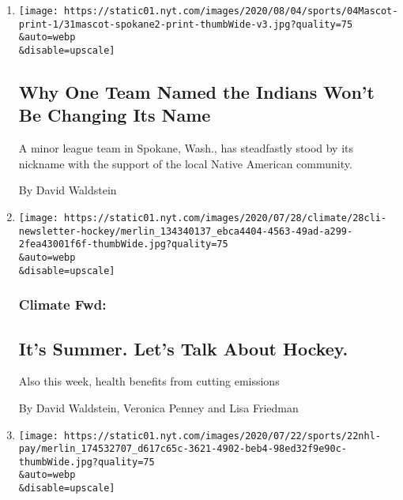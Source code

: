 \begin{enumerate}
\def\labelenumi{\arabic{enumi}.}
\item
  \href{/2020/08/03/sports/baseball/indians-team-names-mascots.html}{}

  \texttt{[image: https://static01.nyt.com/images/2020/08/04/sports/04Mascot-print-1/31mascot-spokane2-print-thumbWide-v3.jpg?quality=75\\\&auto=webp\\\&disable=upscale]}

  \hypertarget{why-one-team-named-the-indians-wont-be-changing-its-name}{%
  \subsection{Why One Team Named the Indians Won't Be Changing Its
  Name}\label{why-one-team-named-the-indians-wont-be-changing-its-name}}

  A minor league team in Spokane, Wash., has steadfastly stood by its
  nickname with the support of the local Native American community.

  By David Waldstein
\item
  \href{/2020/07/29/climate/skating-hockey-climate-change.html}{}

  \texttt{[image: https://static01.nyt.com/images/2020/07/28/climate/28cli-newsletter-hockey/merlin\_134340137\_ebca4404-4563-49ad-a299-2fea43001f6f-thumbWide.jpg?quality=75\\\&auto=webp\\\&disable=upscale]}

  \hypertarget{climate-fwd}{%
  \subsubsection{Climate Fwd:}\label{climate-fwd}}

  \hypertarget{its-summer-lets-talk-about-hockey}{%
  \subsection{It's Summer. Let's Talk About
  Hockey.}\label{its-summer-lets-talk-about-hockey}}

  Also this week, health benefits from cutting emissions

  By David Waldstein, Veronica Penney and Lisa Friedman
\item
  \href{/2020/07/22/sports/hockey/nhl-pay-cut-employees-restart.html}{}

  \texttt{[image: https://static01.nyt.com/images/2020/07/22/sports/22nhl-pay/merlin\_174532707\_d617c65c-3621-4902-beb4-98ed32f9e90c-thumbWide.jpg?quality=75\\\&auto=webp\\\&disable=upscale]}


\end{enumerate}

